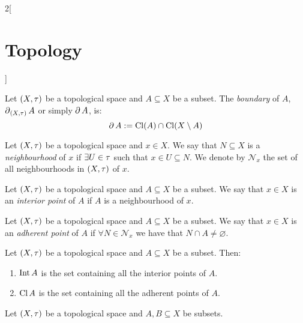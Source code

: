 \documentclass[../../../main.tex]{subfiles}
\begin{document}
\begin{multicols}{2}[\section{Topology}]
\begin{prop}
  \end{prop}
  \begin{definition}[Boundary]
    Let $(X,\tau)$ be a topological space and $A\subseteq X$ be a subset. The \emph{boundary} of $A$, $\operatorname{\partial}_{(X,\tau)}A$ or simply $\operatorname{\partial} A$, is: $$\operatorname{\partial} A:=\operatorname{Cl}(A)\cap\operatorname{Cl}(X\setminus A)$$
  \end{definition}
  \begin{definition}
    Let $(X,\tau)$ be a topological space and $x\in X$. We say that $N\subseteq X$ is a \emph{neighbourhood} of $x$ if $\exists U\in\tau$ such that $x\in U\subseteq N$. We denote by $\mathcal{N}_x$ the set of all neighbourhoods in $(X,\tau)$ of $x$.
  \end{definition}
  \begin{definition}
    Let $(X,\tau)$ be a topological space and $A\subseteq X$ be a subset. We say that $x\in X$ is an \emph{interior point} of $A$ if $A$ is a neighbourhood of $x$.
  \end{definition}
  \begin{definition}
    Let $(X,\tau)$ be a topological space and $A\subseteq X$ be a subset. We say that $x\in X$ is an \emph{adherent point} of $A$ if $\forall N\in\mathcal{N}_x$ we have that $N\cap A\ne\varnothing$.
  \end{definition}
  \begin{prop}
    Let $(X,\tau)$ be a topological space and $A\subseteq X$ be a subset. Then:
    \begin{enumerate}
      \item $\operatorname{Int} A$ is the set containing all the interior points of $A$.
      \item $\operatorname{Cl} A$ is the set containing all the adherent points of $A$.
    \end{enumerate}
  \end{prop}
  \begin{prop}
    Let $(X,\tau)$ be a topological space and $A,B\subseteq X$ be subsets.


\end{prop}
\end{multicols}
\end{document}
